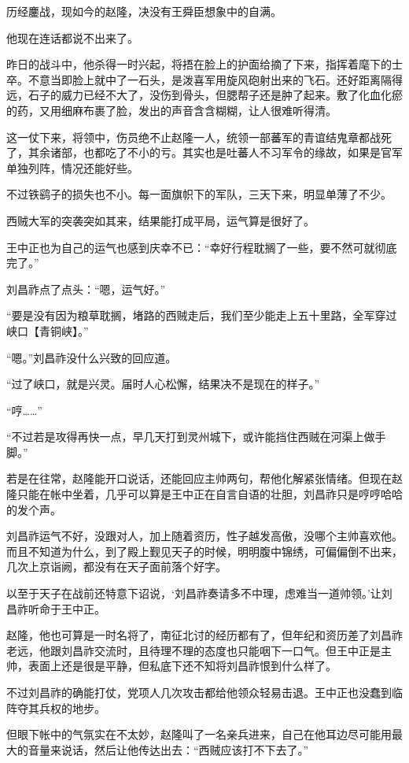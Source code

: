 历经鏖战，现如今的赵隆，决没有王舜臣想象中的自满。

他现在连话都说不出来了。

昨日的战斗中，他杀得一时兴起，将捂在脸上的护面给摘了下来，指挥着麾下的士卒。不意当即脸上就中了一石头，是泼喜军用旋风砲射出来的飞石。还好距离隔得远，石子的威力已经不大了，没伤到骨头，但腮帮子还是肿了起来。敷了化血化瘀的药，又用细麻布裹了脸，发出的声音含含糊糊，让人很难听得清。

这一仗下来，将领中，伤员绝不止赵隆一人，统领一部蕃军的青谊结鬼章都战死了，其余诸部，也都吃了不小的亏。其实也是吐蕃人不习军令的缘故，如果是官军单独列阵，情况还能好些。

不过铁鹞子的损失也不小。每一面旗帜下的军队，三天下来，明显单薄了不少。

西贼大军的突袭突如其来，结果能打成平局，运气算是很好了。

王中正也为自己的运气也感到庆幸不已：“幸好行程耽搁了一些，要不然可就彻底完了。”

刘昌祚点了点头：“嗯，运气好。”

“要是没有因为粮草耽搁，堵路的西贼走后，我们至少能走上五十里路，全军穿过峡口【青铜峡】。”

“嗯。”刘昌祚没什么兴致的回应道。

“过了峡口，就是兴灵。届时人心松懈，结果决不是现在的样子。”

“哼……”

“不过若是攻得再快一点，早几天打到灵州城下，或许能挡住西贼在河渠上做手脚。”

若是在往常，赵隆能开口说话，还能回应主帅两句，帮他化解紧张情绪。但现在赵隆只能在帐中坐着，几乎可以算是王中正在自言自语的壮胆，刘昌祚只是哼哼哈哈的发个声。

刘昌祚运气不好，没跟对人，加上随着资历，性子越发高傲，没哪个主帅喜欢他。而且不知道为什么，到了殿上觐见天子的时候，明明腹中锦绣，可偏偏倒不出来，几次上京诣阙，都没有在天子面前落个好字。

以至于天子在战前还特意下诏说，‘刘昌祚奏请多不中理，虑难当一道帅领。’让刘昌祚听命于王中正。

赵隆，他也可算是一时名将了，南征北讨的经历都有了，但年纪和资历差了刘昌祚老远，他跟刘昌祚交流时，且待理不理的态度也只能咽下一口气。但王中正是主帅，表面上还是很是平静，但私底下还不知将刘昌祚恨到什么样了。

不过刘昌祚的确能打仗，党项人几次攻击都给他领众轻易击退。王中正也没蠢到临阵夺其兵权的地步。

但眼下帐中的气氛实在不太妙，赵隆叫了一名亲兵进来，自己在他耳边尽可能用最大的音量来说话，然后让他传达出去：“西贼应该打不下去了。”


